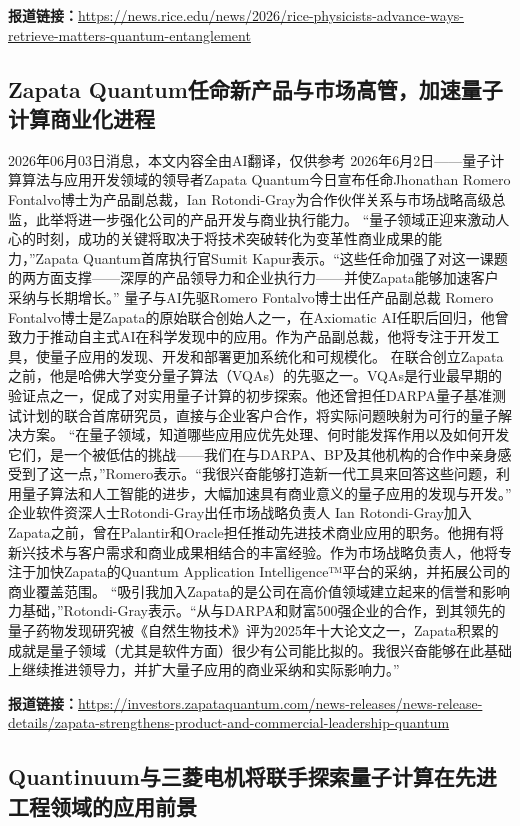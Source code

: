 \documentclass[12pt,a4paper]{ctexart}
\begin{document}
\noindent\textbf{报道链接：}\url{https://news.rice.edu/news/2026/rice-physicists-advance-ways-retrieve-matters-quantum-entanglement}

\subsection{ Zapata Quantum任命新产品与市场高管，加速量子计算商业化进程 }

2026年06月03日消息，本文内容全由AI翻译，仅供参考
2026年6月2日——量子计算算法与应用开发领域的领导者Zapata Quantum今日宣布任命Jhonathan Romero Fontalvo博士为产品副总裁，Ian Rotondi-Gray为合作伙伴关系与市场战略高级总监，此举将进一步强化公司的产品开发与商业执行能力。
“量子领域正迎来激动人心的时刻，成功的关键将取决于将技术突破转化为变革性商业成果的能力，”Zapata Quantum首席执行官Sumit Kapur表示。“这些任命加强了对这一课题的两方面支撑——深厚的产品领导力和企业执行力——并使Zapata能够加速客户采纳与长期增长。”
量子与AI先驱Romero Fontalvo博士出任产品副总裁
Romero Fontalvo博士是Zapata的原始联合创始人之一，在Axiomatic AI任职后回归，他曾致力于推动自主式AI在科学发现中的应用。作为产品副总裁，他将专注于开发工具，使量子应用的发现、开发和部署更加系统化和可规模化。
在联合创立Zapata之前，他是哈佛大学变分量子算法（VQAs）的先驱之一。VQAs是行业最早期的验证点之一，促成了对实用量子计算的初步探索。他还曾担任DARPA量子基准测试计划的联合首席研究员，直接与企业客户合作，将实际问题映射为可行的量子解决方案。
“在量子领域，知道哪些应用应优先处理、何时能发挥作用以及如何开发它们，是一个被低估的挑战——我们在与DARPA、BP及其他机构的合作中亲身感受到了这一点，”Romero表示。“我很兴奋能够打造新一代工具来回答这些问题，利用量子算法和人工智能的进步，大幅加速具有商业意义的量子应用的发现与开发。”
企业软件资深人士Rotondi-Gray出任市场战略负责人
Ian Rotondi-Gray加入Zapata之前，曾在Palantir和Oracle担任推动先进技术商业应用的职务。他拥有将新兴技术与客户需求和商业成果相结合的丰富经验。作为市场战略负责人，他将专注于加快Zapata的Quantum Application Intelligence™平台的采纳，并拓展公司的商业覆盖范围。
“吸引我加入Zapata的是公司在高价值领域建立起来的信誉和影响力基础，”Rotondi-Gray表示。“从与DARPA和财富500强企业的合作，到其领先的量子药物发现研究被《自然生物技术》评为2025年十大论文之一，Zapata积累的成就是量子领域（尤其是软件方面）很少有公司能比拟的。我很兴奋能够在此基础上继续推进领导力，并扩大量子应用的商业采纳和实际影响力。”

\noindent\textbf{报道链接：}\url{https://investors.zapataquantum.com/news-releases/news-release-details/zapata-strengthens-product-and-commercial-leadership-quantum}

\subsection{ Quantinuum与三菱电机将联手探索量子计算在先进工程领域的应用前景 }
\end{document}

